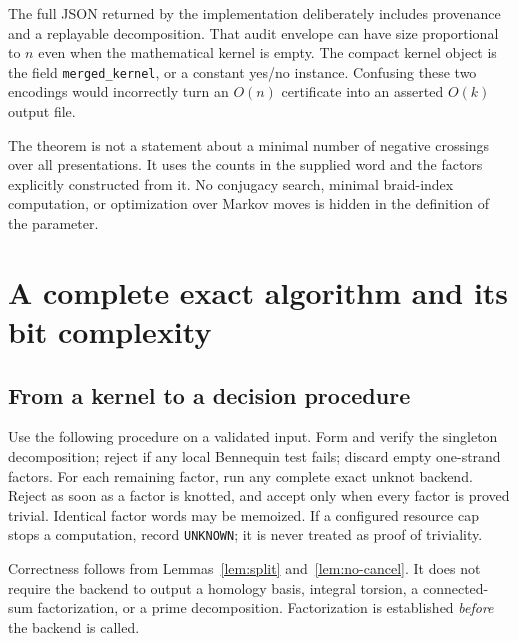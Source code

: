 \documentclass[11pt,letterpaper]{article}
\theoremstyle{definition}
\newcommand{\status}[1]{\textnormal{\texttt{#1}}}
\begin{document}
The full JSON returned by the implementation deliberately includes provenance and a replayable decomposition. That audit envelope can have size proportional to $n$ even when the mathematical kernel is empty. The compact kernel object is the field \texttt{merged\_kernel}, or a constant yes/no instance. Confusing these two encodings would incorrectly turn an $O(n)$ certificate into an asserted $O(k)$ output file.

The theorem is not a statement about a minimal number of negative crossings over all presentations. It uses the counts in the supplied word and the factors explicitly constructed from it. No conjugacy search, minimal braid-index computation, or optimization over Markov moves is hidden in the definition of the parameter.

\section{A complete exact algorithm and its bit complexity}
\label{sec:exact}

\subsection{From a kernel to a decision procedure}
Use the following procedure on a validated input. Form and verify the singleton decomposition; reject if any local Bennequin test fails; discard empty one-strand factors. For each remaining factor, run any complete exact unknot backend. Reject as soon as a factor is knotted, and accept only when every factor is proved trivial. Identical factor words may be memoized. If a configured resource cap stops a computation, record \status{UNKNOWN}; it is never treated as proof of triviality.

Correctness follows from Lemmas~\ref{lem:split} and~\ref{lem:no-cancel}. It does not require the backend to output a homology basis, integral torsion, a connected-sum factorization, or a prime decomposition. Factorization is established \emph{before} the backend is called.
\end{document}
